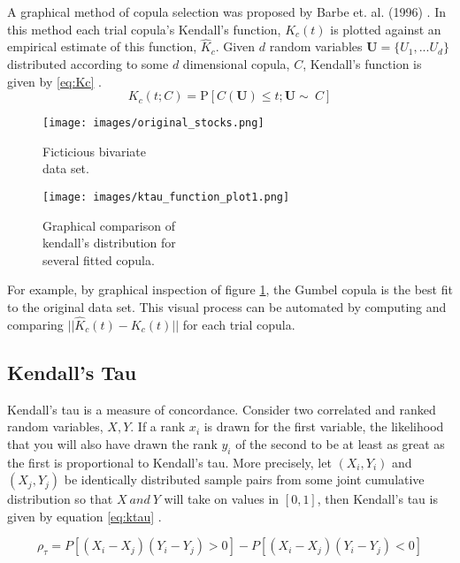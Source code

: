 A graphical method of copula selection was proposed by Barbe et. al. (1996) \cite{Barbe1996}.  In this method each trial copula's Kendall's function, $K_c(t)$ is plotted against an empirical estimate of this function, $\hat K_c$.  Given $d$ random variables $\mathbf U=\{U_1, ... U_d\}$ distributed according to some $d$ dimensional copula, $C$, Kendall's function is given by \ref{eq:Kc} \cite{Joe2015}.
\begin{equation}
K_c(t; C) = \mathrm P \left[C(\mathbf U) \leq t; \mathbf{U} \sim\ C\right]
\label{eq:Kc}
\end{equation}

\begin{figure}[!htbp]
	\centering
	\begin{minipage}{.45\textwidth}
		\texttt{[image: images/original\_stocks.png]}
		\caption{Ficticious bivariate \\ data set.}
		\label{fig:biv_data_ex}
	\end{minipage}%
	\begin{minipage}{.45\textwidth}
		\texttt{[image: images/ktau\_function\_plot1.png]}
		\caption{Graphical comparison of  \\ kendall's distribution for \\ several fitted copula.}
		\label{fig:kc_fn_compare}
	\end{minipage}
\end{figure}
For example, by graphical inspection of figure \ref{fig:kc_fn_compare}, the Gumbel copula is the best fit to the original data set.  This visual process can be automated by computing and comparing $||\hat K_c(t) - K_c(t)||$ for each trial copula.

\subsection*{Kendall's Tau}

Kendall's tau is a measure of concordance.  Consider two correlated and ranked random variables, $X, Y$.
If a rank $x_i$ is drawn for the first variable, the likelihood that you will also have drawn the rank $y_i$ of the second to be at least as great as the first is proportional to Kendall's tau.  More precisely, let $(X_i, Y_i)$ and $(X_j, Y_j)$ be identically distributed sample pairs from some joint cumulative distribution so that $X\ and\ Y$ will take on values in $[0,1]$, then Kendall's tau is given by equation \ref{eq:ktau} \cite{Nelsen2006}.  

\begin{equation}
\rho_\tau = P[(X_i - X_j)(Y_i-Y_j)>0] - P[(X_i - X_j)(Y_i - Y_j)<0]
\label{eq:ktau}
\end{equation}

